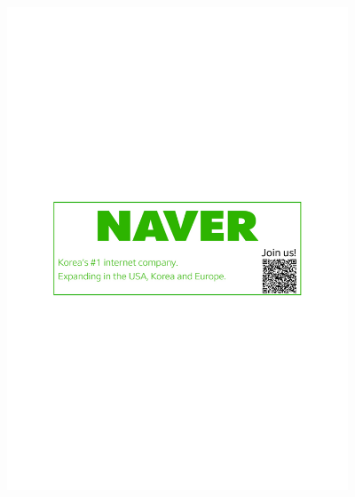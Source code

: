 \thispagestyle{empty}
\thispagestyle{empty}
\begin{center}
  \vfill
  \includegraphics[width=4in]{content/ads/silver/Naver-EMNLP2021.pdf} \\
  \vfill

\end{center}
